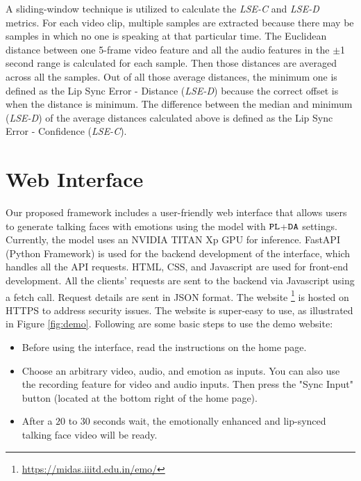 \documentclass[accepted]{uai2023}
\begin{document}
A sliding-window technique is utilized to calculate the \emph{LSE-C} and \emph{LSE-D} metrics. For each video clip, multiple samples are extracted because there may be samples in which no one is speaking at that particular time. The Euclidean distance between one 5-frame video feature and all the audio features in the $\pm$1 second range is calculated for each sample. Then those distances are averaged across all the samples. Out of all those average distances, the minimum one is defined as the Lip Sync Error - Distance (\emph{LSE-D}) because the correct offset is when the distance is minimum.
The difference between the median and minimum (\emph{LSE-D}) of the average distances calculated above is defined as the Lip Sync Error - Confidence (\emph{LSE-C}). 

\section{Web Interface}
Our proposed framework includes a user-friendly web interface \cite{goyal2022emotional} that allows users to generate talking faces with emotions using the model with ${\tt PL}$+${\tt DA}$ settings. Currently, the model uses an NVIDIA TITAN Xp GPU for inference.
FastAPI (Python Framework) is used for the backend development of the interface, which handles all the API requests. HTML, CSS, and Javascript are used for front-end development. All the clients' requests are sent to the backend via Javascript using a fetch call. Request details are sent in JSON format. The website
\footnote{\href{https://midas.iiitd.edu.in/emo/}{https://midas.iiitd.edu.in/emo/}} 
is hosted on HTTPS to address security issues. The website is super-easy to use, as illustrated in Figure \ref{fig:demo}. Following are some basic steps to use the demo website:
\begin{itemize}
    \item Before using the interface, read the instructions on the home page.
    \item Choose an arbitrary video, audio, and emotion as inputs. You can also use the recording feature for video and audio inputs. Then press the "Sync Input" button (located at the bottom right of the home page).
    \item After a $20$ to $30$ seconds wait, the emotionally enhanced and lip-synced talking face video will be ready.
\end{itemize}
\end{document}
